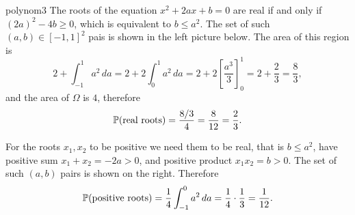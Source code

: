 \begin{sol}{polynom3}
    The roots of the equation $x^2+2ax+b=0$ are real if and only if $(2a)^2-4b\ge0$, which is equivalent to $b\le a^2$. The set of such $(a,b)\in[-1,1]^2$ pais is shown in the left picture below.
    The area of this region is
    \[
        2+\int_{-1}^1a^2\,da=2+2\int_0^1a^2\,da=2+2\left[\frac{a^3}{3}\right]_0^1=2+\frac23=\frac83,
    \]
    and the area of $\Omega$ is $4$, therefore
    \[
        \mathbb{P}(\text{real roots})=\frac{8/3}{4}=\frac{8}{12}=\frac{2}{3}.
    \]
    \begin{center}
    \hspace{1cm}
    \end{center}
    For the roots $x_1,x_2$ to be positive we need them to be real, that is $b\le a^2$, have positive sum $x_1+x_2=-2a>0$, and positive product $x_1x_2=b>0$. The set of such $(a,b)$ pairs is shown on the right. Therefore
    \[
        \mathbb{P}(\text{positive roots})=\frac14\int_{-1}^0a^2\,da=\frac14\cdot\frac13=\frac{1}{12}.
    \]
\end{sol}

